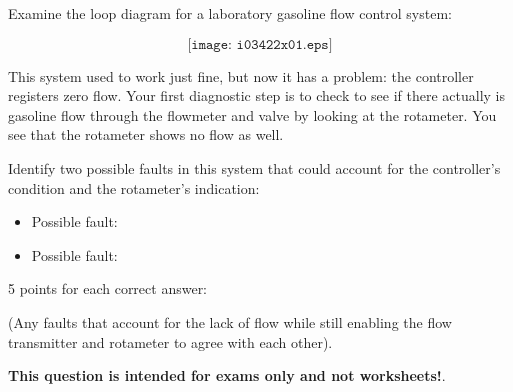 

Examine the loop diagram for a laboratory gasoline flow control system:

$$\texttt{[image: i03422x01.eps]}$$

This system used to work just fine, but now it has a problem: the controller registers zero flow.  Your first diagnostic step is to check to see if there actually is gasoline flow through the flowmeter and valve by looking at the rotameter.  You see that the rotameter shows no flow as well.

Identify two possible faults in this system that could account for the controller's condition and the rotameter's indication:

\begin{itemize}
\item{} Possible fault:
\vskip 10pt
\item{} Possible fault:
\end{itemize}







5 points for each correct answer:

\vskip 10pt

(Any faults that account for the lack of flow while still enabling the flow transmitter and rotameter to agree with each other).







{\bf This question is intended for exams only and not worksheets!}.



